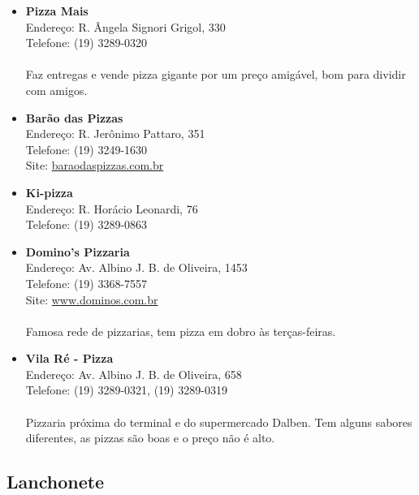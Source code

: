 \begin{itemize}
\item \textbf{Pizza Mais}
  \\Endereço: R. Ângela Signori Grigol, 330
  \\Telefone: (19) 3289-0320
  \\
  \\Faz entregas e vende pizza gigante por um preço amigável, bom para dividir
  com amigos.

\item \textbf{Barão das Pizzas}
  \\Endereço: R. Jerônimo Pattaro, 351
  \\Telefone: (19) 3249-1630
  \\Site: \url{baraodaspizzas.com.br}

\item \textbf{Ki-pizza}
  \\Endereço: R. Horácio Leonardi, 76
  \\Telefone: (19) 3289-0863

\item \textbf{Domino's Pizzaria}
  \\Endereço: Av. Albino J. B. de Oliveira, 1453
  \\Telefone: (19) 3368-7557
  \\Site: \url{www.dominos.com.br}
  \\
  \\Famosa rede de pizzarias, tem pizza em dobro às terças-feiras.

\item \textbf{Vila Ré - Pizza}
  \\Endereço: Av. Albino J. B. de Oliveira, 658
  \\Telefone: (19) 3289-0321, (19) 3289-0319
  \\
  \\Pizzaria próxima do terminal e do supermercado Dalben. Tem alguns sabores
  diferentes, as pizzas são boas e o preço não é alto.
\end{itemize}

\subsection{Lanchonete}

